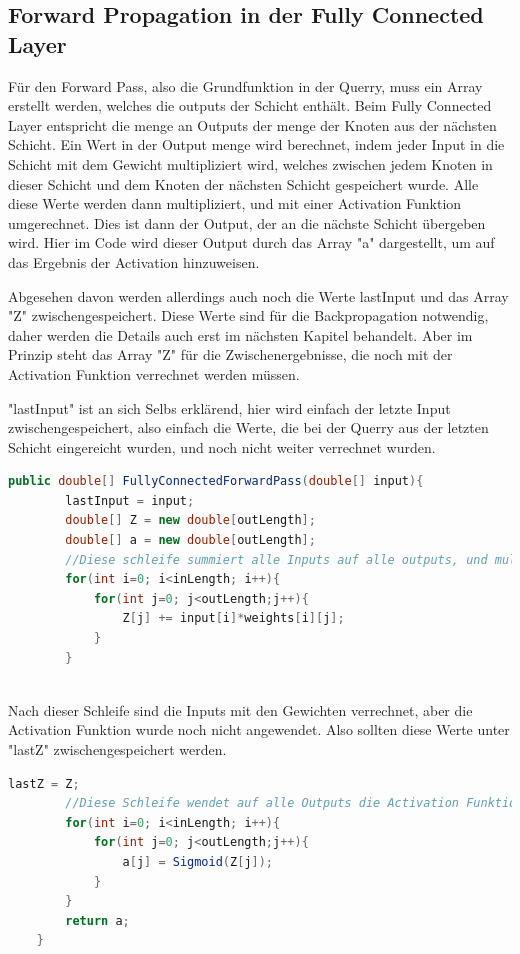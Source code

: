 \documentclass[12pt]{article}
\begin{document}
\subsection{Forward Propagation in der Fully Connected Layer}

Für den Forward Pass, also die Grundfunktion in der Querry, muss ein Array erstellt werden, welches die outputs der Schicht enthält. Beim Fully Connected Layer entspricht die menge an Outputs der menge der Knoten aus der nächsten Schicht. Ein Wert in der Output menge wird berechnet, indem jeder Input in die Schicht mit dem Gewicht multipliziert wird, welches zwischen jedem Knoten in dieser Schicht und dem Knoten der nächsten Schicht gespeichert wurde. Alle diese Werte werden dann multipliziert, und mit einer Activation Funktion umgerechnet. Dies ist dann der Output, der an die nächste Schicht übergeben wird. Hier im Code wird dieser Output durch das Array "a" dargestellt, um auf das Ergebnis der Activation hinzuweisen.

Abgesehen davon werden allerdings auch noch die Werte lastInput und das Array "Z" zwischengespeichert. Diese Werte sind für die Backpropagation notwendig, daher werden die Details auch erst im nächsten Kapitel behandelt. Aber im Prinzip steht das Array "Z" für die Zwischenergebnisse, die noch mit der Activation Funktion verrechnet werden müssen.

"lastInput" ist an sich Selbs erklärend, hier wird einfach der letzte Input zwischengespeichert, also einfach die Werte, die bei der Querry aus der letzten Schicht eingereicht wurden, und noch nicht weiter verrechnet wurden.
\clearpage
\begin{lstlisting}[language=Java]
    public double[] FullyConnectedForwardPass(double[] input){
        lastInput = input;
        double[] Z = new double[outLength];
        double[] a = new double[outLength];
        //Diese schleife summiert alle Inputs auf alle outputs, und multipliziert die Inputs mit ihren jeweiligen gewichten aus der weights-Matrix
        for(int i=0; i<inLength; i++){
            for(int j=0; j<outLength;j++){
                Z[j] += input[i]*weights[i][j];
            }
        }
        
\end{lstlisting}
Nach dieser Schleife sind die Inputs mit den Gewichten verrechnet, aber die Activation Funktion wurde noch nicht angewendet. Also sollten diese Werte unter "lastZ" zwischengespeichert werden.
\begin{lstlisting}[language=Java] 
        lastZ = Z;
		//Diese Schleife wendet auf alle Outputs die Activation Funktion an, in diesem Falle die Sigmoid Funktion
        for(int i=0; i<inLength; i++){
            for(int j=0; j<outLength;j++){
                a[j] = Sigmoid(Z[j]);
            }
        }
        return a;
    }
\end{lstlisting} 
\end{document}
